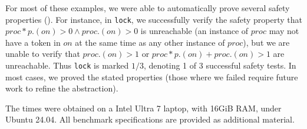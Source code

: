 


For most of these examples, we were able to automatically prove
several safety properties ().  For instance, in
\texttt{lock}, we successfully verify the safety property that
$\mathit{proc}*p.(\mathit{on}) > 0 \wedge \mathit{proc}.(\mathit{on})
> 0$ is unreachable (\ie an instance of $\mathit{proc}$ may not have a token in
$\mathit{on}$ at the same time as any other instance of
$\mathit{proc}$), but we are unable to verify that
$\mathit{proc}.(\mathit{on}) > 1$ or $\mathit{proc}*p.(\mathit{on}) +
\mathit{proc}.(\mathit{on}) > 1$ are unreachable. Thus \texttt{lock}
is marked $1/3$, denoting 1 of 3 successful safety tests. In most
cases, we proved the stated properties (those where we failed require
future work to refine the abstraction).

The times were obtained on a Intel Ultra 7 laptop, with 16GiB RAM,
under Ubuntu 24.04. All benchmark specifications are provided as
additional material.




